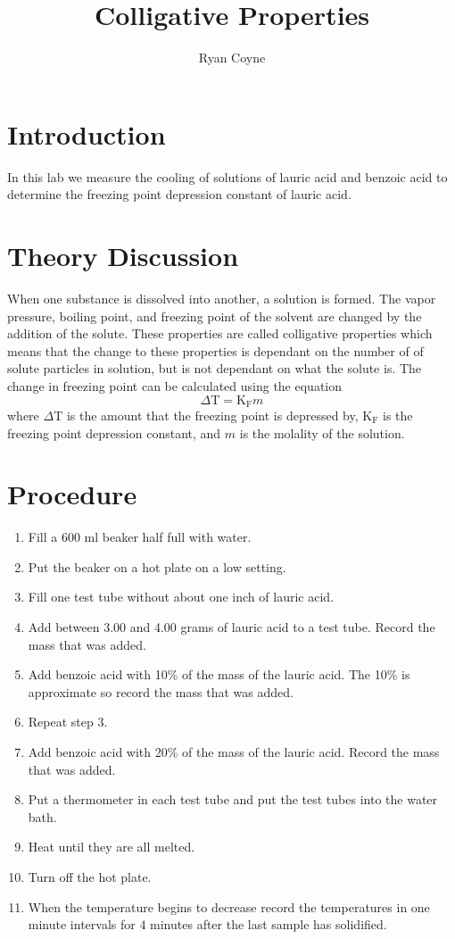 \documentclass[12pt]{article}
\begin{document}
    \title{Colligative Properties}
    \author{Ryan Coyne}
    \maketitle
    \section*{Introduction}
        In this lab we measure the cooling of solutions of lauric acid and benzoic acid to determine the freezing point depression constant of lauric acid.
    \section*{Theory Discussion}
        When one substance is dissolved into another, a solution is formed. The vapor pressure, boiling point, and freezing point of the solvent are changed by the addition of the solute. These properties are called colligative properties which means that the change to these properties is dependant on the number of of solute particles in solution, but is not dependant on what the solute is. The change in freezing point can be calculated using the equation\
        \begin{equation*}
            \Delta \text{T} = \text{K}_\text{F}m
        \end{equation*}
        where \(\Delta\)T is the amount that the freezing point is depressed by, \(\text{K}_\text{F}\) is the freezing point depression constant, and \(m\) is the molality of the solution.
    \section*{Procedure}
        \begin{enumerate}
            \item Fill a 600 ml beaker half full with water.
            \item Put the beaker on a hot plate on a low setting.
            \item Fill one test tube without about one inch of lauric acid.
            \item Add between 3.00 and 4.00 grams of lauric acid to a test tube. Record the mass that was added.
            \item Add benzoic acid with 10\% of the mass of the lauric acid. The 10\% is approximate so record the mass that was added.
            \item Repeat step 3.
            \item Add benzoic acid with 20\% of the mass of the lauric acid. Record the mass that was added.
            \item Put a thermometer in each test tube and put the test tubes into the water bath.
            \item Heat until they are all melted.
            \item Turn off the hot plate.
            \item When the temperature begins to decrease record the temperatures in one minute intervals for 4 minutes after the last sample has solidified.
        \end{enumerate}
\end{document}
